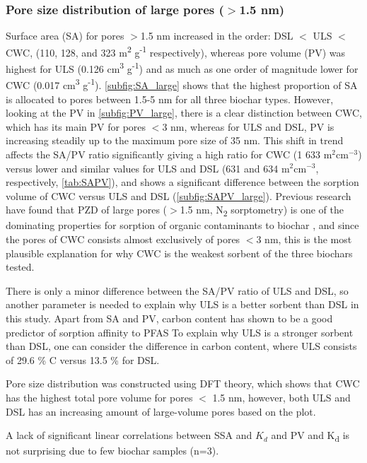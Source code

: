 \subsubsection{Pore size distribution of large pores ($>$1.5 nm)}
Surface area (SA) for pores $>$1.5 nm increased in the order: DSL $<$ ULS $<$ CWC, (110, 128, and 323 m\textsuperscript{2} g\textsuperscript{-1} respectively), whereas pore volume (PV) was highest for ULS (0.126 cm\textsuperscript{3} g\textsuperscript{-1}) and as much as one order of magnitude lower for CWC (0.017 cm\textsuperscript{3} g\textsuperscript{-1}). \cref{subfig:SA_large} shows that the highest proportion of SA is allocated to pores between 1.5-5 nm for all three biochar types. However, looking at the PV in \cref{subfig:PV_large}, there is a clear distinction between CWC, which has its main PV for pores $<$3 nm, whereas for ULS and DSL, PV is increasing steadily up to the maximum pore size of 35 nm. This shift in trend affects the SA/PV ratio significantly giving a high ratio for CWC (1 633 $\mathrm{m^2 cm^{-3}}$) versus lower and similar values for ULS and DSL (631 and 634 $\mathrm{m^2 cm^{-3}}$, respectively, \cref{tab:SAPV}), and shows a significant difference between the sorption volume of CWC versus ULS and DSL (\cref{subfig:SAPV_large}). Previous research have found that PZD of large pores ($>$1.5 nm, N\textsubscript{2} sorptometry) is one of the dominating properties for sorption of organic contaminants to biochar \citep{Sormo2021,Hale2016,Ahmad2014}, and since the pores of CWC consists almost exclusively of pores $<$3 nm, this is the most plausible explanation for why CWC is the weakest sorbent of the three biochars tested. 

There is only a minor difference between the SA/PV ratio of ULS and DSL, so another parameter is needed to explain why ULS is a better sorbent than DSL in this study. Apart from SA and PV, carbon content has shown to be a good predictor of sorption affinity to PFAS To explain why ULS is a stronger sorbent than DSL, one can consider the difference in carbon content, where ULS consists of 29.6 \% C versus 13.5 \% for DSL. 

Pore size distribution was constructed using DFT theory, which shows that CWC has the highest total pore volume for pores $<$ 1.5 nm, however, both ULS and DSL has an increasing amount of large-volume pores based on the plot. 

A lack of significant linear correlations between SSA and $K_d$ and PV and K\textsubscript{d} is not surprising due to few biochar samples (n=3). 

